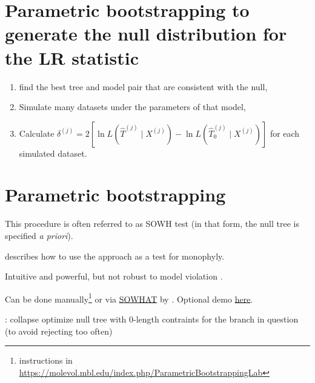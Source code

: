 

\myNewSlide
\section*{Parametric bootstrapping to generate the null distribution for the LR statistic}
\begin{enumerate}
    \item find the best tree and model pair that are consistent with the null,
    \item Simulate many datasets under the parameters of that model,
    \item Calculate $\delta^{(j)} = 2\left[\ln L (\hat{T}^{(j)} \mid  X^{(j)}) - \ln L (\hat{T}_{0}^{(j)} \mid  X^{(j)})\right]$ for each simulated dataset.
\end{enumerate}


\myNewSlide
\section*{Parametric bootstrapping}
This procedure is often referred to as SOWH test (in that form, the null tree is specified {\em a priori}).

\citet{HuelsenbeckHN1996} describes how to use the approach as a test for monophyly.

Intuitive and powerful, but not robust to model violation \citep{Buckley2002}.

Can be done manually\footnote{instructions in \url{https://molevol.mbl.edu/index.php/ParametricBootstrappingLab}}
or via \href{https://github.com/josephryan/sowhat}{SOWHAT} by \citet{SOWHAT}. Optional demo \href{https://molevol.mbl.edu/index.php/SOWHAT}{here}.

\citet{Susko2014}: collapse optimize null tree with 0-length contraints for the branch in question (to avoid rejecting too often)

\myNewSlide
 


\myNewSlide
 